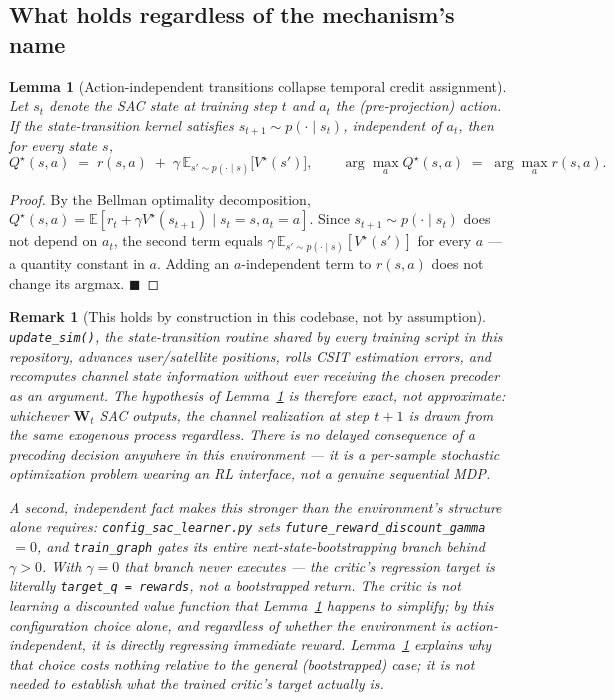 \documentclass[11pt]{article}
\newtheorem{lemma}{Lemma}
\newtheorem{remark}{Remark}
\begin{document}
\subsection{What holds regardless of the mechanism's name}
\label{sec:bandit-fact}

\begin{lemma}[Action-independent transitions collapse temporal credit assignment]
\label{lem:bandit}
Let $s_t$ denote the SAC state at training step $t$ and $a_t$ the
(pre-projection) action. If the state-transition kernel satisfies
$s_{t+1}\sim p(\cdot\mid s_t)$, independent of $a_t$, then for every state $s$,
$$
Q^\star(s,a) \;=\; r(s,a) \;+\; \gamma\,\mathbb{E}_{s'\sim p(\cdot\mid s)}\big[V^\star(s')\big],
\qquad
\arg\max_a Q^\star(s,a) \;=\; \arg\max_a r(s,a).
$$
\end{lemma}
\begin{proof}
By the Bellman optimality decomposition,
$Q^\star(s,a)=\mathbb{E}[r_t+\gamma V^\star(s_{t+1})\mid s_t=s,a_t=a]$. Since
$s_{t+1}\sim p(\cdot\mid s_t)$ does not depend on $a_t$, the second term
equals $\gamma\,\mathbb{E}_{s'\sim p(\cdot\mid s)}[V^\star(s')]$ for every
$a$ --- a quantity constant in $a$. Adding an $a$-independent term to $r(s,a)$
does not change its argmax. $\blacksquare$
\end{proof}

\begin{remark}[This holds by construction in this codebase, not by assumption]
\texttt{update\_sim()}, the state-transition routine shared by every training
script in this repository, advances user/satellite positions, rolls CSIT
estimation errors, and recomputes channel state information without ever
receiving the chosen precoder as an argument. The hypothesis of
Lemma~\ref{lem:bandit} is therefore exact, not approximate: whichever
$\mathbf{W}_t$ SAC outputs, the channel realization at step $t+1$ is drawn
from the same exogenous process regardless. There is no delayed consequence
of a precoding decision anywhere in this environment --- it is a per-sample
stochastic optimization problem wearing an RL interface, not a genuine
sequential MDP.

A second, independent fact makes this stronger than the environment's
structure alone requires: \texttt{config\_sac\_learner.py} sets
\texttt{future\_reward\_discount\_gamma}$\,=0$, and \texttt{train\_graph}
gates its entire next-state-bootstrapping branch behind $\gamma>0$. With
$\gamma=0$ that branch never executes --- the critic's regression target is
literally \texttt{target\_q = rewards}, not a bootstrapped return. The
critic is not learning a discounted value function that Lemma~\ref{lem:bandit}
happens to simplify; by this configuration choice alone, and regardless of
whether the environment is action-independent, it is directly regressing
immediate reward. Lemma~\ref{lem:bandit} explains why that choice costs
nothing relative to the general (bootstrapped) case; it is not needed to
establish what the trained critic's target actually is.
\end{remark}
\end{document}
